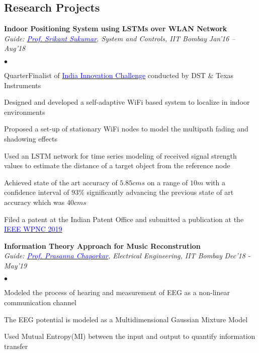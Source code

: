 \documentclass[margin,line, 9pt]{res}
\newenvironment{list2}{
  \begin{list}{$\bullet$}{%
      \setlength{\itemsep}{0.03in}
      \setlength{\parsep}{0in} \setlength{\parskip}{0in}
      \setlength{\topsep}{0in} \setlength{\partopsep}{0in} 
      \setlength{\leftmargin}{0.2in}}}{\end{list}}
\begin{document}
\begin{resume}
\section{\sc Research Projects}
{\bf Indoor Positioning System using LSTMs over WLAN Network} \\
{\em Guide: \href{http://www.sc.iitb.ac.in/~srikant/dokuwiki/doku.php}{\textcolor{blue}{Prof. Srikant Sukumar}}, System and Controls, IIT Bombay} \hfill{\it Jan'16 -- Aug'18} \\
\vspace*{-.13in}
\begin{list2}
\item QuarterFinalist of \href{https://innovate.mygov.in/india-innovation-challenge-design-contest-2018/}{\textcolor{blue} {India Innovation Challenge}} conducted by DST \& Texas Instruments
\item Designed and developed a self-adaptive WiFi based system to localize in indoor environments
\item Proposed a set-up of stationary WiFi nodes to model the multipath fading and shadowing effects
\item Used an LSTM network for time series modeling of received signal strength values to estimate the distance of a target object from the reference node
\item Achieved state of the art accuracy of $5.85 cms$ on a range of $10 m$ with a confidence interval of $93\%$ significantly advancing the previous state of art accuracy which was $40 cms$
\item Filed a patent at the Indian Patent Office and submitted a publication at the  \href{https://wpnc.info}{\textcolor{blue}{IEEE WPNC 2019}}
\end{list2}
% 
{\bf Information Theory Approach for Music Reconstrution} \\
{\em Guide: \href{https://www.ee.iitb.ac.in/wiki/faculty/chaporkar}{\textcolor{blue}{Prof. Prasanna Chaporkar}}, Electrical Engineering, IIT Bombay} \hfill {\it Dec'18 - May'19}\\
\vspace*{-.13in}
\begin{list2}
\item Modeled the process of hearing and measurement of EEG as a non-linear communication channel
\item The EEG potential is modeled as a Multidimensional Gaussian Mixture Model
\item Used Mutual Entropy(MI) between the input and output to quantify information transfer

\end{list2}
\end{resume}
\end{document}
